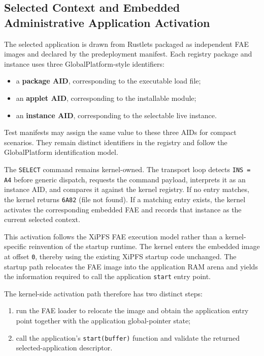 \subsection{Selected Context and Embedded Administrative Application Activation}
\label{sec:impl-selected-context}

The selected application is drawn from Rustlets packaged as independent FAE
images and declared by the predeployment manifest. Each registry package and
instance uses three GlobalPlatform-style identifiers:
\begin{itemize}
\item a \textbf{package AID}, corresponding to the executable load file;
\item an \textbf{applet AID}, corresponding to the installable module;
\item an \textbf{instance AID}, corresponding to the selectable live
  instance.
\end{itemize}

Test manifests may assign the same value to these three AIDs for compact
scenarios. They remain distinct identifiers in the registry and follow the
GlobalPlatform identification model.

The \texttt{SELECT} command remains kernel-owned. The transport loop
detects \texttt{INS = A4} before generic dispatch, requests the command
payload, interprets it as an instance AID, and compares it against the
kernel registry. If no entry matches, the kernel returns \texttt{6A82}
(file not found). If a matching entry exists, the kernel activates the
corresponding embedded FAE and records that instance as the current
selected context.

This activation follows the XiPFS FAE execution model rather than a
kernel-specific reinvention of the startup runtime. The kernel enters
the embedded image at offset \texttt{0}, thereby using the existing
XiPFS startup code unchanged. The startup path relocates the FAE image
into the application RAM arena and yields the information required to
call the application \texttt{start} entry point.

The kernel-side activation path therefore has two distinct steps:
\begin{enumerate}
\item run the FAE loader to relocate the image and obtain the
  application entry point together with the application global-pointer
  state;
\item call the application's \texttt{start(buffer)}
  function and validate the returned selected-application descriptor.
\end{enumerate}

